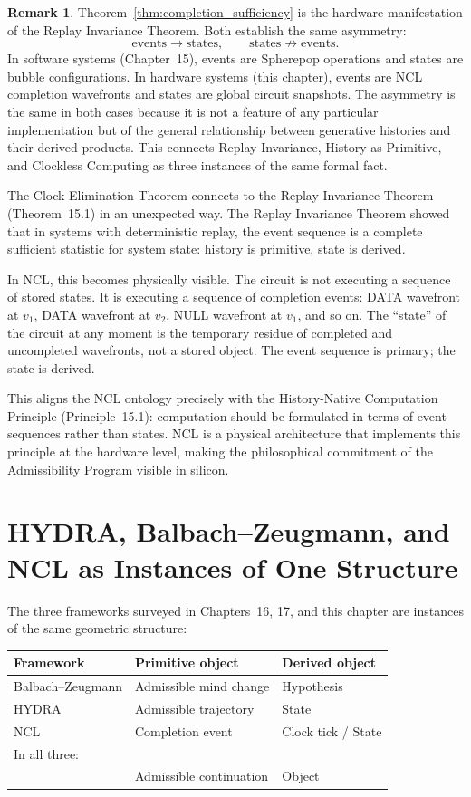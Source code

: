\documentclass[12pt, oneside]{book}
\theoremstyle{flyxion}
\theoremstyle{definition}
\newtheorem{remark}[theorem]{Remark}
\begin{document}
\begin{remark}
Theorem~\ref{thm:completion_sufficiency} is the
hardware manifestation of the Replay Invariance
Theorem. Both establish the same asymmetry:
\[
\text{events} \to \text{states}, \qquad
\text{states} \not\to \text{events}.
\]
In software systems (Chapter~15), events are Spherepop
operations and states are bubble configurations. In
hardware systems (this chapter), events are NCL
completion wavefronts and states are global circuit
snapshots. The asymmetry is the same in both cases
because it is not a feature of any particular
implementation but of the general relationship between
generative histories and their derived products. This
connects Replay Invariance, History as Primitive, and
Clockless Computing as three instances of the same
formal fact.
\end{remark}

The Clock Elimination Theorem connects to the Replay
Invariance Theorem (Theorem~15.1) in an unexpected
way. The Replay Invariance Theorem showed that in
systems with deterministic replay, the event sequence
is a complete sufficient statistic for system state:
history is primitive, state is derived.

In NCL, this becomes physically visible. The circuit
is not executing a sequence of stored states. It is
executing a sequence of completion events: DATA
wavefront at $v_1$, DATA wavefront at $v_2$, NULL
wavefront at $v_1$, and so on. The ``state'' of the
circuit at any moment is the temporary residue of
completed and uncompleted wavefronts, not a stored
object. The event sequence is primary; the state is
derived.

This aligns the NCL ontology precisely with the
History-Native Computation Principle (Principle~15.1):
computation should be formulated in terms of event
sequences rather than states. NCL is a physical
architecture that implements this principle at the
hardware level, making the philosophical commitment
of the Admissibility Program visible in silicon.

\section{HYDRA, Balbach--Zeugmann, and NCL as Instances
         of One Structure}

The three frameworks surveyed in Chapters~16, 17, and
this chapter are instances of the same geometric
structure:

\begin{center}
\renewcommand{\arraystretch}{1.4}
\begin{tabular}{lll}
\toprule
Framework & Primitive object & Derived object \\
\midrule
Balbach--Zeugmann & Admissible mind change &
  Hypothesis \\
HYDRA & Admissible trajectory & State \\
NCL & Completion event & Clock tick / State \\
\midrule
\multicolumn{3}{l}{In all three:} \\
& Admissible continuation & Object \\
\bottomrule
\end{tabular}
\end{center}
\end{document}
